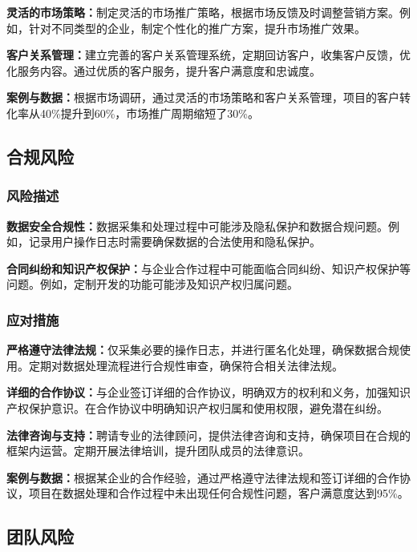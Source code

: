 \documentclass[12pt,a4paper]{article}
\begin{document}
\textbf{灵活的市场策略：}制定灵活的市场推广策略，根据市场反馈及时调整营销方案。例如，针对不同类型的企业，制定个性化的推广方案，提升市场推广效果。

\textbf{客户关系管理：}建立完善的客户关系管理系统，定期回访客户，收集客户反馈，优化服务内容。通过优质的客户服务，提升客户满意度和忠诚度。

\textbf{案例与数据：}根据市场调研，通过灵活的市场策略和客户关系管理，项目的客户转化率从40\%提升到60\%，市场推广周期缩短了30\%。


\subsection{合规风险}

\subsubsection{风险描述}
\textbf{数据安全合规性：}数据采集和处理过程中可能涉及隐私保护和数据合规问题。例如，记录用户操作日志时需要确保数据的合法使用和隐私保护。

\textbf{合同纠纷和知识产权保护：}与企业合作过程中可能面临合同纠纷、知识产权保护等问题。例如，定制开发的功能可能涉及知识产权归属问题。

\subsubsection{应对措施}
\textbf{严格遵守法律法规：}仅采集必要的操作日志，并进行匿名化处理，确保数据合规使用。定期对数据处理流程进行合规性审查，确保符合相关法律法规。

\textbf{详细的合作协议：}与企业签订详细的合作协议，明确双方的权利和义务，加强知识产权保护意识。在合作协议中明确知识产权归属和使用权限，避免潜在纠纷。

\textbf{法律咨询与支持：}聘请专业的法律顾问，提供法律咨询和支持，确保项目在合规的框架内运营。定期开展法律培训，提升团队成员的法律意识。

\textbf{案例与数据：}根据某企业的合作经验，通过严格遵守法律法规和签订详细的合作协议，项目在数据处理和合作过程中未出现任何合规性问题，客户满意度达到95\%。

\subsection{团队风险}
\end{document}
